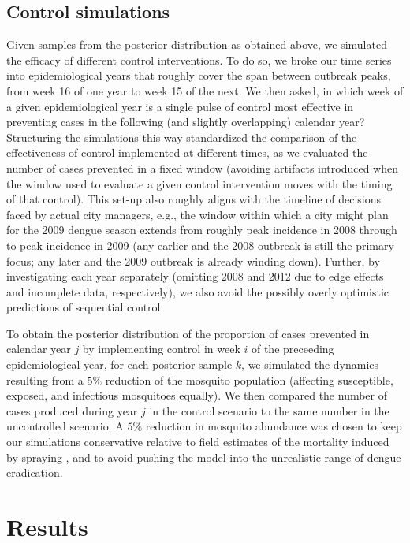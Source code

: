 \documentclass[10pt,letterpaper]{article}
\begin{document}
\subsection*{Control simulations}

Given samples from the posterior distribution as obtained above, we simulated the efficacy of different control interventions.
To do so, we broke our time series into epidemiological years that roughly cover the span between outbreak peaks, from week 16 of one year to week 15 of the next.
We then asked, in which week of a given epidemiological year is a single pulse of control most effective in preventing cases in the following (and slightly overlapping) calendar year?
Structuring the simulations this way standardized the comparison of the effectiveness of control implemented at different times, as we evaluated the number of cases prevented in a fixed window (avoiding artifacts introduced when the window used to evaluate a given control intervention moves with the timing of that control).
This set-up also roughly aligns with the timeline of decisions faced by actual city managers, e.g., the window within which a city might plan for the 2009 dengue season extends from roughly peak incidence in 2008 through to peak incidence in 2009 (any earlier and the 2008 outbreak is still the primary focus; any later and the 2009 outbreak is already winding down).
Further, by investigating each year separately (omitting 2008 and 2012 due to edge effects and incomplete data, respectively), we also avoid the possibly overly optimistic predictions of sequential control.
 
To obtain the posterior distribution of the proportion of cases prevented in calendar year $j$ by implementing control in week $i$ of the preceeding epidemiological year, for each posterior sample $k$, we simulated the dynamics resulting from a $5\%$ reduction of the mosquito population (affecting susceptible, exposed, and infectious mosquitoes equally).
We then compared the number of cases produced during year $j$ in the control scenario to the same number in the uncontrolled scenario.
A $5\%$ reduction in mosquito abundance was chosen to keep our simulations conservative relative to field estimates of the mortality induced by spraying \cite{Esu2010}, and to avoid pushing the model into the unrealistic range of dengue eradication.

\section*{Results}
\end{document}
